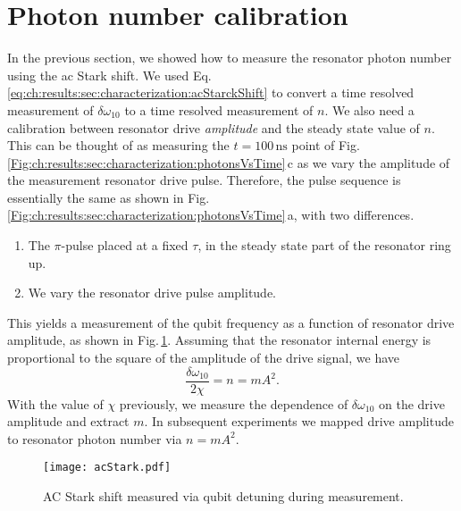 \section{Photon number calibration}

In the previous section, we showed how to measure the resonator photon number using the ac Stark shift.
We used Eq.\,\ref{eq:ch:results:sec:characterization:acStarckShift} to convert a time resolved measurement of $\delta \omega_{10}$ to a time resolved measurement of $n$.
We also need a calibration between resonator drive \emph{amplitude} and the steady state value of $n$.
This can be thought of as measuring the $t=100\,\text{ns}$ point of Fig.\,\ref{Fig:ch:results:sec:characterization:photonsVsTime}\,c as we vary the amplitude of the measurement resonator drive pulse.
Therefore, the pulse sequence is essentially the same as shown in Fig.\,\ref{Fig:ch:results:sec:characterization:photonsVsTime}\,a, with two differences.
\begin{enumerate}
\item The $\pi$-pulse placed at a fixed $\tau$, in the steady state part of the resonator ring up.
\item We vary the resonator drive pulse amplitude.
\end{enumerate}
This yields a measurement of the qubit frequency as a function of resonator drive amplitude, as shown in Fig.\,\ref{Fig:ch:results:sec:photonNumberCalibration:acStark}.
Assuming that the resonator internal energy is proportional to the square of the amplitude of the drive signal, we have \begin{equation}
\frac{\delta \omega_{10}}{2 \chi} = n = m A^2 . \end{equation}
With the value of $\chi$ previously, we measure the dependence of $\delta \omega_{10}$ on the drive amplitude and extract $m$.
In subsequent experiments we mapped drive amplitude to resonator photon number via $n = mA^2$.

\begin{figure}
\begin{centering}
\texttt{[image: acStark.pdf]}
\par\end{centering}
\caption{AC Stark shift measured via qubit detuning during measurement.}
\label{Fig:ch:results:sec:photonNumberCalibration:acStark}
\end{figure}
